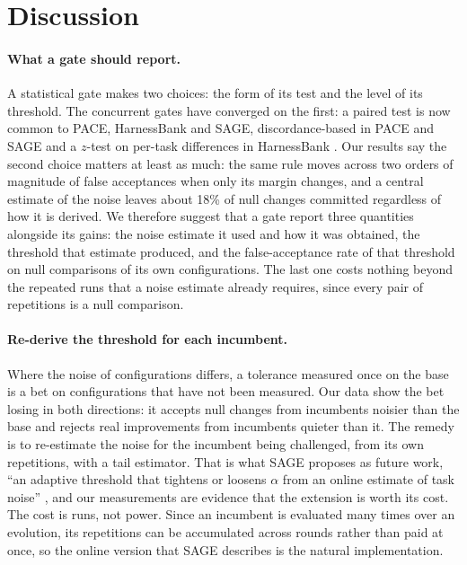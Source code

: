 
\section{Discussion}\label{sec:discussion}

\paragraph{What a gate should report.}
A statistical gate makes two choices: the form of its test and the level of its
threshold. The concurrent gates have converged on the first: a paired test is now common to PACE, HarnessBank and SAGE, discordance-based in PACE and SAGE and a $z$-test on per-task differences in HarnessBank \citep{zayxshawn2026pace,luo2026harnessbank,wang2026sage}. Our results say the
second choice matters at least as much: the same rule moves across two orders of
magnitude of false acceptances when only its margin changes, and a central
estimate of the noise leaves about 18\% of null changes committed regardless of
how it is derived. We therefore suggest that a gate report three quantities
alongside its gains: the noise estimate it used and how it was obtained, the
threshold that estimate produced, and the false-acceptance rate of that
threshold on null comparisons of its own configurations. The last one costs
nothing beyond the repeated runs that a noise estimate already requires, since
every pair of repetitions is a null comparison.

\paragraph{Re-derive the threshold for each incumbent.}
Where the noise of configurations differs, a tolerance measured once on the base
is a bet on configurations that have not been measured. Our data show the bet
losing in both directions: it accepts null changes from incumbents noisier than
the base and rejects real improvements from incumbents quieter than it. The
remedy is to re-estimate the noise for the incumbent being challenged, from its
own repetitions, with a tail estimator. That is what SAGE proposes as future
work, ``an adaptive threshold that tightens or loosens $\alpha$ from an online
estimate of task noise'' \citep{wang2026sage}, and our measurements are evidence
that the extension is worth its cost. The cost is runs, not power. Since an
incumbent is evaluated many times over an evolution, its repetitions can be
accumulated across rounds rather than paid at once, so the online version that
SAGE describes is the natural implementation.

